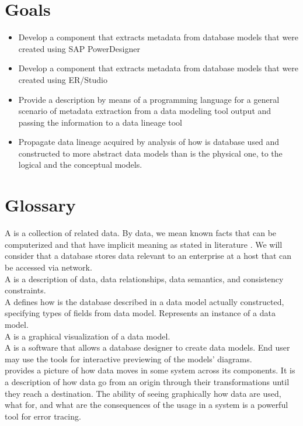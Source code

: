 \section{Goals}

\begin{itemize}
	\item Develop a component that extracts metadata from database models that were created using SAP PowerDesigner 
	\item Develop a component that extracts metadata from database models that were created using ER/Studio
	\item Provide a description by means of a programming language for a general scenario of metadata extraction from a data modeling tool output and passing the information to a data lineage tool
	\item Propagate data lineage acquired by analysis of how is database used and constructed to more abstract data models than is the physical one, to the logical and the conceptual models.
\end{itemize}


\section{Glossary}
A  is a collection of related data. By data, we mean known facts that can be computerized and that have implicit meaning as stated in literature \cite{ElmasryNavathe15}. We will consider that a database stores data relevant to an enterprise at a host that can be accessed via network. \\

A  is a description of data, data relationships, data semantics, and consistency constraints. \label{DataModel} \\
 
A  defines how is the database described in a data model actually constructed, specifying types of fields from data model. Represents an instance of a data model. \\

A  is a graphical visualization of a data model. \\

A  is a software that allows a database designer to create data models. End user may use the tools for interactive previewing of the models' diagrams. \\

 provides a picture of how data moves in some system across its components. It is a description of how data go from an origin through their transformations until they reach a destination. 
The ability of seeing graphically how data are used, what for, and what are the consequences of the usage in a system is a powerful tool for error tracing. \\

